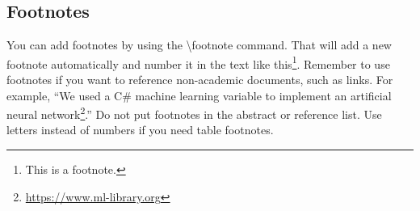 \documentclass[conference]{IEEEtran}
\begin{document}
\subsection{Footnotes}

You can add footnotes by using the \textbackslash footnote command. That will add a new footnote automatically and number it in the text like this\footnote{This is a footnote.}. Remember to use footnotes if you want to reference non-academic documents, such as links. For example, “We used a C\# machine learning variable to implement an artificial neural network\footnote{\url{https://www.ml-library.org}}.” Do not put footnotes in the abstract or reference list. Use letters instead of numbers if you need table footnotes.
\end{document}

